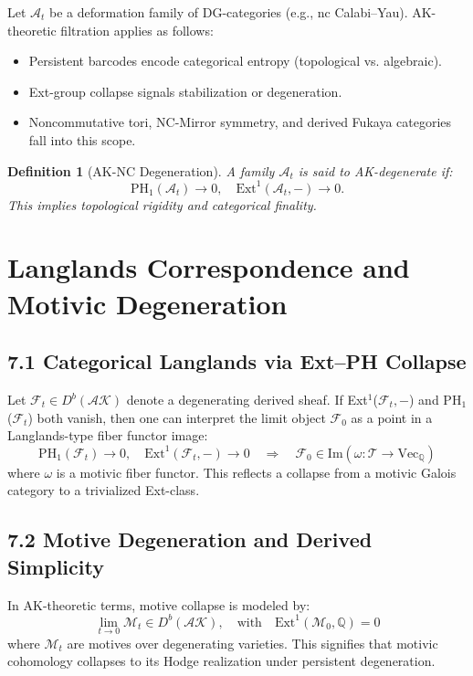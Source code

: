 \documentclass[11pt]{article}
\newtheorem{definition}[theorem]{Definition}
\begin{document}
Let \( \mathcal{A}_t \) be a deformation family of DG-categories (e.g., nc Calabi–Yau).  
AK-theoretic filtration applies as follows:

\begin{itemize}
    \item Persistent barcodes encode categorical entropy (topological vs. algebraic).
    \item Ext-group collapse signals stabilization or degeneration.
    \item Noncommutative tori, NC-Mirror symmetry, and derived Fukaya categories fall into this scope.
\end{itemize}

\begin{definition}[AK-NC Degeneration]
A family \( \mathcal{A}_t \) is said to AK-degenerate if:
\[
\mathrm{PH}_1(\mathcal{A}_t) \to 0, \quad \mathrm{Ext}^1(\mathcal{A}_t, -) \to 0.
\]
This implies topological rigidity and categorical finality.
\end{definition}



\section{Langlands Correspondence and Motivic Degeneration}

\subsection{7.1 Categorical Langlands via Ext–PH Collapse}

Let \( \mathcal{F}_t \in D^b(\mathcal{AK}) \) denote a degenerating derived sheaf. If Ext\(^1\)(\(\mathcal{F}_t, -\)) and PH\(_1\)(\(\mathcal{F}_t\)) both vanish, then one can interpret the limit object \( \mathcal{F}_0 \) as a point in a Langlands-type fiber functor image:
\[
\mathrm{PH}_1(\mathcal{F}_t) \to 0, \quad \mathrm{Ext}^1(\mathcal{F}_t, -) \to 0 \quad \Rightarrow \quad \mathcal{F}_0 \in \mathrm{Im}(\omega: \mathcal{T} \to \mathrm{Vec}_\mathbb{Q})
\]
where \( \omega \) is a motivic fiber functor. This reflects a collapse from a motivic Galois category to a trivialized Ext-class.

\subsection{7.2 Motive Degeneration and Derived Simplicity}

In AK-theoretic terms, motive collapse is modeled by:
\[
\lim_{t \to 0} \mathcal{M}_t \in D^b(\mathcal{AK}), \quad \text{with} \quad \mathrm{Ext}^1(\mathcal{M}_0, \mathbb{Q}) = 0
\]
where \( \mathcal{M}_t \) are motives over degenerating varieties. This signifies that motivic cohomology collapses to its Hodge realization under persistent degeneration.
\end{document}
